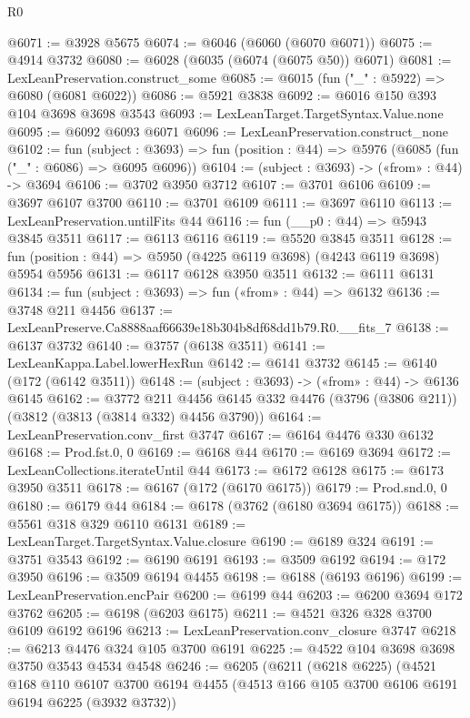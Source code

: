 \begin{lexlean}{R0}
\begin{coremodule}
@6071 := @3928 @5675
@6074 := @6046 (@6060 (@6070 @6071))
@6075 := @4914 @3732
@6080 := @6028 (@6035 (@6074 (@6075 @50)) @6071)
@6081 := LexLeanPreservation.construct_some
@6085 := @6015 (fun ("_" : @5922) => @6080 (@6081 @6022))
@6086 := @5921 @3838
@6092 := @6016 @150 @393 @104 @3698 @3698 @3543
@6093 := LexLeanTarget.TargetSyntax.Value.none
@6095 := @6092 @6093 @6071
@6096 := LexLeanPreservation.construct_none
@6102 := fun (subject : @3693) =>
  fun (position : @44) => @5976 (@6085 (fun ("_" : @6086) => @6095 @6096))
@6104 := (subject : @3693) -> («from» : @44) -> @3694
@6106 := @3702 @3950 @3712
@6107 := @3701 @6106
@6109 := @3697 @6107 @3700
@6110 := @3701 @6109
@6111 := @3697 @6110
@6113 := LexLeanPreservation.untilFits @44
@6116 := fun (__p0 : @44) => @5943 @3845 @3511
@6117 := @6113 @6116
@6119 := @5520 @3845 @3511
@6128 := fun (position : @44) => @5950 (@4225 @6119 @3698) (@4243 @6119 @3698) @5954 @5956
@6131 := @6117 @6128 @3950 @3511
@6132 := @6111 @6131
@6134 := fun (subject : @3693) => fun («from» : @44) => @6132
@6136 := @3748 @211 @4456
@6137 := LexLeanPreserve.Ca8888aaf66639e18b304b8df68dd1b79.R0.__fits_7
@6138 := @6137 @3732
@6140 := @3757 (@6138 @3511)
@6141 := LexLeanKappa.Label.lowerHexRun
@6142 := @6141 @3732
@6145 := @6140 (@172 (@6142 @3511))
@6148 := (subject : @3693) -> («from» : @44) -> @6136 @6145
@6162 := @3772
    @211
    @4456
    @6145
    @332
    @4476
    (@3796 (@3806 @211))
    (@3812 (@3813 (@3814 @332) @4456 @3790))
@6164 := LexLeanPreservation.conv_first @3747
@6167 := @6164 @4476 @330 @6132
@6168 := Prod.fst.{0, 0}
@6169 := @6168 @44
@6170 := @6169 @3694
@6172 := LexLeanCollections.iterateUntil @44
@6173 := @6172 @6128
@6175 := @6173 @3950 @3511
@6178 := @6167 (@172 (@6170 @6175))
@6179 := Prod.snd.{0, 0}
@6180 := @6179 @44
@6184 := @6178 (@3762 (@6180 @3694 @6175))
@6188 := @5561 @318 @329 @6110 @6131
@6189 := LexLeanTarget.TargetSyntax.Value.closure
@6190 := @6189 @324
@6191 := @3751 @3543
@6192 := @6190 @6191
@6193 := @3509 @6192
@6194 := @172 @3950
@6196 := @3509 @6194 @4455
@6198 := @6188 (@6193 @6196)
@6199 := LexLeanPreservation.encPair
@6200 := @6199 @44
@6203 := @6200 @3694 @172 @3762
@6205 := @6198 (@6203 @6175)
@6211 := @4521 @326 @328 @3700 @6109 @6192 @6196
@6213 := LexLeanPreservation.conv_closure @3747
@6218 := @6213 @4476 @324 @105 @3700 @6191
@6225 := @4522 @104 @3698 @3698 @3750 @3543 @4534 @4548
@6246 := @6205
    (@6211
      (@6218 @6225)
      (@4521
        @168
        @110
        @6107
        @3700
        @6194
        @4455
        (@4513 @166 @105 @3700 @6106 @6191 @6194 @6225 (@3932 @3732))

\end{coremodule}
\end{lexlean}

